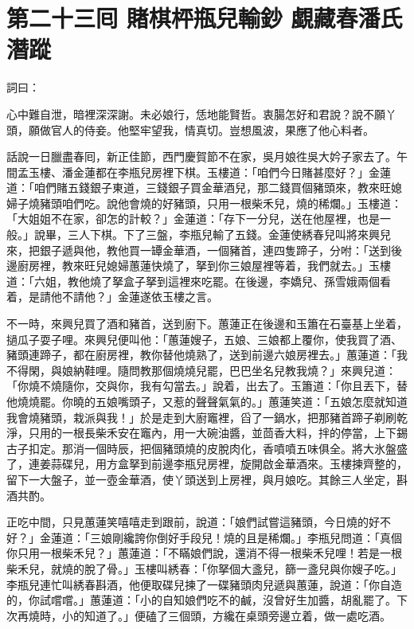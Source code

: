 
\chapter*{第二十三囘 賭棋枰瓶兒輸鈔 覷藏春潘氏潛蹤}


詞曰：

\begin{myquote} 
心中難自泄，暗裡深深謝。未必娘行，恁地能賢哲。衷腸怎好和君說？說不願丫頭，願做官人的侍妾。他堅牢望我，情真切。豈想風波，果應了他心料者。

\end{myquote} 

話說一日臘盡春囘，新正佳節，西門慶賀節不在家，吳月娘徃吳大妗子家去了。午間孟玉樓、潘金蓮都在李瓶兒房裡下棋。玉樓道：「咱們今日賭甚麼好？」金蓮道：「咱們賭五錢銀子東道，三錢銀子買金華酒兒，那二錢買個豬頭來，教來旺媳婦子燒豬頭咱們吃。說他會燒的好豬頭，只用一根柴禾兒，燒的稀爛。」玉樓道：「大姐姐不在家，卻怎的計較？」金蓮道：「存下一分兒，送在他屋裡，也是一般。」說畢，三人下棋。下了三盤，李瓶兒輸了五錢。{}金蓮使綉春兒叫將來興兒來，把銀子遞與他，教他買一罈金華酒，一個豬首，連四隻蹄子，分咐：「送到後邊廚房裡，教來旺兒媳婦蕙蓮快燒了，拏到你三娘屋裡等着，我們就去。」玉樓道：「六姐，教他燒了拏盒子拏到這裡來吃罷。在後邊，李嬌兒、孫雪娥兩個看着，是請他不請他？」{}金蓮遂依玉樓之言。

不一時，來興兒買了酒和豬首，送到廚下。蕙蓮正在後邊和玉簫在石臺基上坐着，撾瓜子耍子哩。來興兒便叫他：「蕙蓮嫂子，五娘、三娘都上覆你，使我買了酒、豬頭連蹄子，都在廚房裡，教你替他燒熟了，送到前邊六娘房裡去。」蕙蓮道：「我不得閑，與娘納鞋哩。隨問教那個燒燒兒罷，巴巴坐名兒教我燒？」來興兒道：「你燒不燒隨你，交與你，我有勾當去。」說着，出去了。玉簫道：「你且丟下，替他燒燒罷。你曉的五娘嘴頭子，又惹的聲聲氣氣的。」蕙蓮笑道：「五娘怎麼就知道我會燒豬頭，栽派與我！」於是走到大廚竈裡，舀了一鍋水，把那豬首蹄子剃刷乾淨，只用的一根長柴禾安在竈內，用一大碗油醬，並茴香大料，拌的停當，上下錫古子扣定。那消一個時辰，把個豬頭燒的皮脫肉化，香噴噴五味俱全。將大氷盤盛了，連姜蒜碟兒，用方盒拏到前邊李瓶兒房裡，旋開啟金華酒來。玉樓揀齊整的，留下一大盤子，並一壺金華酒，使丫頭送到上房裡，與月娘吃。其餘三人坐定，斟酒共酌。

正吃中間，只見蕙蓮笑嘻嘻走到跟前，說道：「娘們試嘗這豬頭，今日燒的好不好？」金蓮道：「三娘剛纔誇你倒好手段兒！燒的且是稀爛。」李瓶兒問道：「真個你只用一根柴禾兒？」蕙蓮道：「不瞞娘們說，還消不得一根柴禾兒哩！若是一根柴禾兒，就燒的脫了骨。」玉樓叫綉春：「你拏個大盞兒，篩一盞兒與你嫂子吃。」李瓶兒連忙叫綉春斟酒，他便取碟兒揀了一碟豬頭肉兒遞與蕙蓮，說道：「你自造的，你試嚐嚐。」蕙蓮道：「小的自知娘們吃不的鹹，沒曾好生加醬，胡亂罷了。下次再燒時，小的知道了。」{}便磕了三個頭，方纔在桌頭旁邊立着，做一處吃酒。

